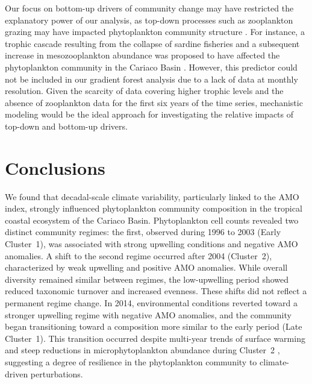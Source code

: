 \documentclass[]{agujournal2019}
\begin{document}
    Our focus on bottom-up drivers of community change may have restricted the explanatory power of our analysis, as top-down processes such as zooplankton grazing may have impacted phytoplankton community structure \cite{frank_ups_2007, banas_adding_2011, acevedo-trejos_mechanisms_2015}.  For instance, a trophic cascade resulting from the collapse of sardine fisheries and a subsequent increase in mesozooplankton abundance was proposed to have affected the phytoplankton community in the Cariaco Basin \cite{rueda-roa_spatial_2017, muller-karger_scientific_2019}. However, this predictor could not be included in our gradient forest analysis due to a lack of data at monthly resolution. Given the scarcity of data covering higher trophic levels and the absence of zooplankton data for the first six years of the time series, mechanistic modeling would be the ideal approach for investigating the relative impacts of top-down and bottom-up drivers.


    

\section{Conclusions}

    We found that decadal-scale climate variability, particularly linked to the AMO index, strongly influenced phytoplankton community composition in the tropical coastal ecosystem of the Cariaco Basin. Phytoplankton cell counts revealed two distinct community regimes: the first, observed during 1996 to 2003 (Early Cluster~1), was associated with strong upwelling conditions and negative AMO anomalies. A shift to the second regime occurred after 2004 (Cluster~2), characterized by weak upwelling and positive AMO anomalies. While overall diversity remained similar between regimes, the low-upwelling period showed reduced taxonomic turnover and increased evenness. These shifts did not reflect a permanent regime change. In 2014, environmental conditions reverted toward a stronger upwelling regime with negative AMO anomalies, and the community began transitioning toward a composition more similar to the early period (Late Cluster~1). This transition occurred despite multi-year trends of surface warming and steep reductions in microphytoplankton abundance during Cluster~2 \cite{taylor_ecosystem_2012}, suggesting a degree of resilience in the phytoplankton community to climate-driven perturbations.
\end{document}
